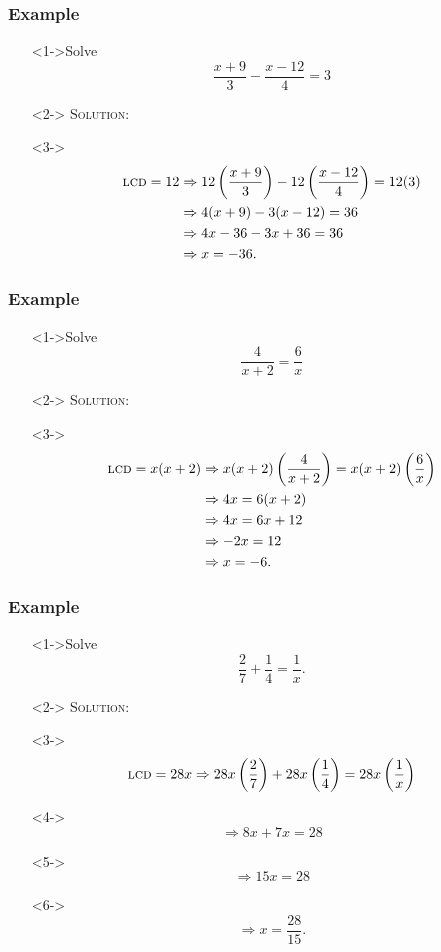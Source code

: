 \documentclass[handout]{beamer}
\begin{document}
\begin{frame}
	\frametitle{Example}
	\begin{enumerate}
		\item[]<1->Solve
		\[
			\frac{x+9}{3}-\frac{x-12}{4}=3
		\]
		\item[]<2-> \textsc{Solution:}
		\item[]<3->
		\begin{align*}
			\text{\textsc{lcd}}=12 & \Rightarrow 12 \left( \frac{x+9}{3} \right)-12 \left( \frac{x-12}{4} \right)=12(3)  \\
			& \Rightarrow 4(x+9)-3(x-12)=36 \\
			& \Rightarrow 4x-36-3x+36=36 \\
			& \Rightarrow x=-36.
		\end{align*}
	\end{enumerate}
\end{frame}

\begin{frame}
	\frametitle{Example}
	\begin{enumerate}
		\item[]<1->Solve
		\[
			\frac{4}{x+2}=\frac{6}{x}
		\]
		\item[]<2-> \textsc{Solution:}
		\item[]<3->
		\begin{align*}
			\text{\textsc{lcd}}=x(x+2) & \Rightarrow x(x+2) \left( \frac{4}{x+2} \right)=x(x+2) \left( \frac{6}{x} \right) \\
			& \Rightarrow 4x=6(x+2) \\
			& \Rightarrow 4x=6x+12 \\
			& \Rightarrow -2x=12 \\
			& \Rightarrow x=-6.
		\end{align*}
	\end{enumerate}
\end{frame}

\begin{frame}
	\frametitle{Example}
	\begin{enumerate}
		\item[]<1->Solve
		\[
			\frac{2}{7}+\frac{1}{4}=\frac{1}{x}.
		\]
		\item[]<2-> \textsc{Solution:}
		\item[]<3-> \[ \text{\textsc{lcd}}=28x \Rightarrow 28x \left( \frac{2}{7} \right)+28x\left(\frac{1}{4} \right) =28x \left( \frac{1}{x} \right) \]
		\item[]<4-> \[ \Rightarrow 8x+7x=28 \]
		\item[]<5-> \[ \Rightarrow 15x=28 \]
		\item[]<6-> \[ \Rightarrow x=\frac{28}{15}. \]
	\end{enumerate}
\end{frame}
\end{document}

